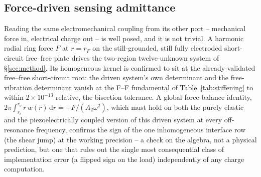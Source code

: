 \documentclass[11pt]{article}
\begin{document}
\subsection{Force-driven sensing admittance}\label{sec:Y-sense}
Reading the same electromechanical coupling from its other port --
mechanical force in, electrical charge out -- is well posed, and it is
not trivial. A harmonic radial ring force $F$ at $r=r_F$ on the
still-grounded, still fully electroded short-circuit free--free plate
drives the two-region twelve-unknown system of \S\ref{sec:method}. Its
homogeneous kernel is confirmed to sit at the already-validated
free--free short-circuit root: the driven system's own determinant and
the free-vibration determinant vanish at the F--F fundamental of
Table~\ref{tab:stiffening} to within $2\times10^{-13}$ relative, the
bisection tolerance. A global force-balance
identity, $2\pi\int_{r_i}^{r_o}r\,w(r)\,\mathrm dr=-F/(A_2\omega^2)$,
which must hold on both the purely elastic and the piezoelectrically
coupled version of this driven system at every off-resonance frequency,
confirms the sign of the one inhomogeneous interface row (the shear
jump) at the working precision -- a check on the algebra, not a physical
prediction, but one that rules out the single most consequential class
of implementation error (a flipped sign on the load) independently of
any charge computation.
\end{document}
